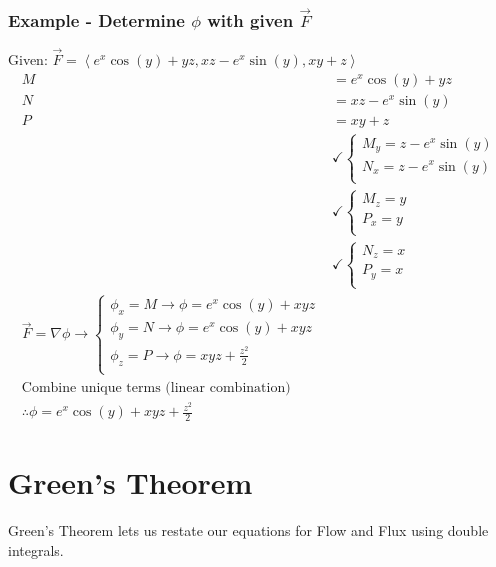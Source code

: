 \documentclass{article}
\newcommand{\nvec}[1]{\left\langle #1 \right\rangle}
\begin{document}
        \subsubsection{Example - Determine $\phi$ with given $\vec{F}$}
        Given: $\vec{F} = \nvec{e^x\cos(y) + yz, xz-e^x\sin(y), xy+z}$
        \[
        \begin{aligned}
            M &= e^x\cos(y) + yz\\
            N &= xz - e^x\sin(y)\\
            P &= xy+z\\
            &\checkmark\begin{cases}
            M_y = z-e^x\sin(y)\\
            N_x = z-e^x\sin(y)\\
            \end{cases}\\
            &\checkmark\begin{cases}
            M_z = y\\
            P_x = y\\
            \end{cases}\\
            &\checkmark\begin{cases}
            N_z = x\\
            P_y = x\\
            \end{cases}\\
            \vec{F}=\nabla\phi \to
            \begin{cases}
            \phi_x = M \to \phi = e^x\cos(y)+xyz\\
            \phi_y = N \to \phi = e^x\cos(y)+xyz\\
            \phi_z = P \to \phi = xyz + \frac{z^2}{2}\\
            \end{cases}\\
            \text{Combine unique terms (linear combination)}\\
            \therefore \phi = e^x\cos(y) + xyz + \frac{z^2}{2}
        \end{aligned}
        \]

\section{Green's Theorem}

Green's Theorem lets us restate our equations for Flow and Flux using double integrals.
\end{document}
